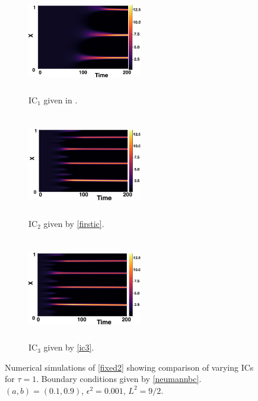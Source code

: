 \begin{figure}[H]
    \centering
    \begin{subfigure}[b]{0.32\textwidth}
        \centering
        \includegraphics[width=5cm,height=4.5cm]{gaff1.png}
        \caption{$\text{IC}_1$ given in \cite{gaffmonk}.}
        \label{}
    \end{subfigure}
    \hfill
    \begin{subfigure}[b]{0.32\textwidth}
        \centering
        \includegraphics[width=5cm,height=4.5cm]{ic21.png}
        \caption{$\text{IC}_2$ given by \eqref{firstic}.}
        \label{}
    \end{subfigure}
    \hfill
    \begin{subfigure}[b]{0.32\textwidth}
        \centering
        \includegraphics[width=5cm,height=4.5cm]{ic31.png}
        \caption{$\text{IC}_3$ given by \eqref{ic3}.}
        \label{}
    \end{subfigure}
    \caption{Numerical simulations of \eqref{fixed2} showing comparison of varying ICs for $\tau=1$. Boundary conditions given by \eqref{neumannbc}. $(a,b)=(0.1,0.9)$, $\epsilon^2=0.001$, $L^2=9/2$.}
    \label{fig:figtau1}
\end{figure}
